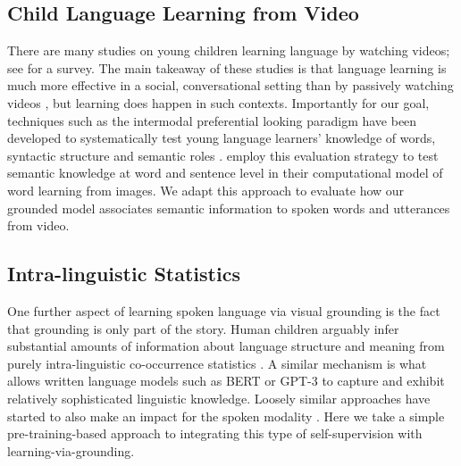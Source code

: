 \subsection{Child Language Learning from Video}
There are many studies on young children learning language by watching
videos; see \citet{vanderplank2010deja} for a survey. The main takeaway
of these studies is that language learning is much more effective in a
social, conversational setting than by passively watching videos
\cite{kuhl2003foreign,anderson2005television,robb2009just},
but learning does happen in such
contexts. Importantly for our goal, techniques such as the intermodal
preferential looking paradigm have been developed to systematically test young 
language learners' knowledge of words, syntactic structure and semantic roles
\cite{hirsh1996intermodal,bergelson20126,noble2011comprehension}.
\citet{nikolaus-fourtassi-2021-evaluating}
employ this evaluation strategy to test semantic knowledge at word and
sentence level in their computational model of word learning from
images. We adapt this approach to evaluate how our grounded model
associates semantic information to spoken words and utterances from
video.

\subsection{Intra-linguistic Statistics}
One further aspect of learning spoken language via visual grounding is
the fact that grounding is only part of the story. Human children
arguably infer substantial amounts of information about language
structure and meaning from purely intra-linguistic co-occurrence
statistics \citep[e.g.,][]{saffran1996statistical}. A similar mechanism is what 
allows 
written language models
such as BERT \citep{devlin-etal-2019-bert} or GPT-3 \citep{brown2020language} 
to capture and exhibit relatively sophisticated
linguistic knowledge. Loosely similar approaches have started to also
make an impact for the spoken modality
\citep[e.g.][]{wav2vec2,hsu2021hubert}. Here we take a simple
pre-training-based approach to integrating this type of
self-supervision with learning-via-grounding.


